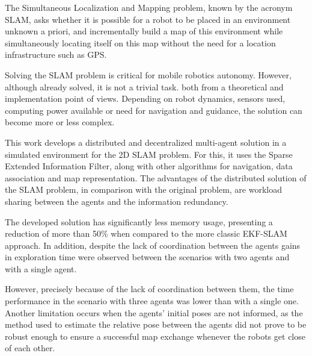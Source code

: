 The Simultaneous Localization and Mapping problem, known by the acronym SLAM, asks whether it is possible for a robot to be placed in an environment
unknown a priori, and incrementally build a map of this
environment while simultaneously locating itself on this map without the
need for a location infrastructure such as GPS.

Solving the SLAM problem is critical for mobile robotics
autonomy. However, although already solved, it is not a trivial task.
both from a theoretical and implementation point of views.
Depending on robot dynamics, sensors used, computing power available or need for navigation and guidance, the solution
can become more or less complex.

This work develops a distributed and decentralized multi-agent solution in a simulated environment
for the 2D SLAM problem. For this, it uses the Sparse Extended Information Filter, along with other algorithms for navigation,
data association and map representation. The advantages of the distributed solution of the
SLAM problem, in comparison with the original problem, are workload sharing
between the agents and the information redundancy.

The developed solution has significantly less memory usage,
presenting a reduction of more than 50\% when compared to the more classic EKF-SLAM approach.
In addition, despite the lack of coordination between the agents
gains in exploration time were observed between the scenarios with two agents and with a single agent.

However, precisely because of the lack of
coordination between them, the time performance in the scenario with
three agents was lower than with a single one. Another limitation occurs
when the agents' initial poses are not informed, as the method used to 
estimate the relative pose between the agents did not prove to be robust
enough to ensure a successful map exchange whenever the robots get close 
of each other.